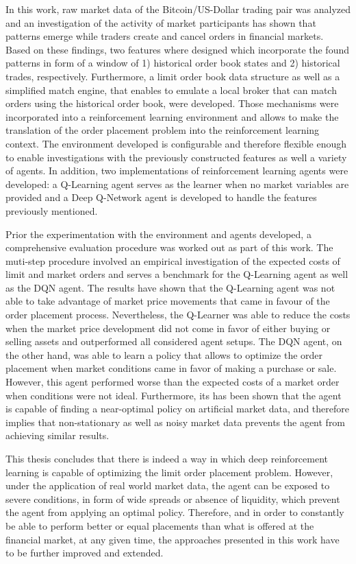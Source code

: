 In this work, raw market data of the Bitcoin/US-Dollar trading pair was analyzed and an investigation of the activity of market participants has shown that patterns emerge while traders create and cancel orders in financial markets.
Based on these findings, two features where designed which incorporate the found patterns in form of a window of 1) historical order book states and 2) historical trades, respectively.
Furthermore, a limit order book data structure as well as a simplified match engine, that enables to emulate a local broker that can match orders using the historical order book, were developed.
Those mechanisms were incorporated into a reinforcement learning environment and allows to make the translation of the order placement problem into the reinforcement learning context.
The environment developed is configurable and therefore flexible enough to enable investigations with the previously constructed features as well a variety of agents.
In addition, two implementations of reinforcement learning agents were developed: a Q-Learning agent serves as the learner when no market variables are provided and a Deep Q-Network agent is developed to handle the features previously mentioned.

Prior the experimentation with the environment and agents developed, a comprehensive evaluation procedure was worked out as part of this work.
The muti-step procedure involved an empirical investigation of the expected costs of limit and market orders and serves a benchmark for the Q-Learning agent as well as the DQN agent.
The results have shown that the Q-Learning agent was not able to take advantage of market price movements that came in favour of the order placement process.
Nevertheless, the Q-Learner was able to reduce the costs when the market price development did not come in favor of either buying or selling assets and outperformed all considered agent setups.
The DQN agent, on the other hand, was able to learn a policy that allows to optimize the order placement when market conditions came in favor of making a purchase or sale.
However, this agent performed worse than the expected costs of a market order when conditions were not ideal.
Furthermore, its has been shown that the agent is capable of finding a near-optimal policy on artificial market data, and therefore implies that non-stationary as well as noisy market data prevents the agent from achieving similar results.

This thesis concludes that there is indeed a way in which deep reinforcement learning is capable of optimizing the limit order placement problem.
However, under the application of real world market data, the agent can be exposed to severe conditions, in form of wide spreads or absence of liquidity, which prevent the agent from applying an optimal policy.
Therefore, and in order to constantly be able to perform better or equal placements than what is offered at the financial market, at any given time, the approaches presented in this work have to be further improved and extended.

